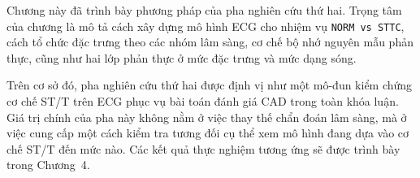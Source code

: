 \blocksep

Chương này đã trình bày phương pháp của pha nghiên cứu thứ hai. Trọng tâm của chương là mô tả cách xây dựng mô hình ECG cho nhiệm vụ \texttt{NORM vs STTC}, cách tổ chức đặc trưng theo các nhóm lâm sàng, cơ chế bộ nhớ nguyên mẫu phản thực, cũng như hai lớp phản thực ở mức đặc trưng và mức dạng sóng.

\blocksep

Trên cơ sở đó, pha nghiên cứu thứ hai được định vị như một mô-đun kiểm chứng cơ chế ST/T trên ECG phục vụ bài toán đánh giá CAD trong toàn khóa luận. Giá trị chính của pha này không nằm ở việc thay thế chẩn đoán lâm sàng, mà ở việc cung cấp một cách kiểm tra tương đối cụ thể xem mô hình đang dựa vào cơ chế ST/T đến mức nào. Các kết quả thực nghiệm tương ứng sẽ được trình bày trong Chương~4.
